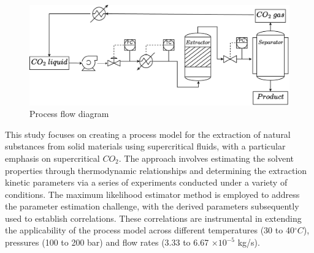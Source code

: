 \documentclass[../Article_Model_Parameters.tex]{subfiles}
\begin{document}
	\begin{figure}[h!]
		\centering
		\includegraphics[width=\columnwidth]{Figures/PFD.drawio.pdf}
		\caption{Process flow diagram}
		\label{fig: SFE_drawing}
	\end{figure}
	
	
	
	This study focuses on creating a process model for the extraction of natural substances from solid materials using supercritical fluids, with a particular emphasis on supercritical $CO_2$. The approach involves estimating the solvent properties through thermodynamic relationships and determining the extraction kinetic parameters via a series of experiments conducted under a variety of conditions. The maximum likelihood estimator method is employed to address the parameter estimation challenge, with the derived parameters subsequently used to establish correlations. These correlations are instrumental in extending the applicability of the process model across different temperatures (30 to 40$^\circ C$), pressures (100 to 200 bar) and flow rates (3.33 to 6.67 $\times 10^{-5}$ kg/s).
	
\end{document}
